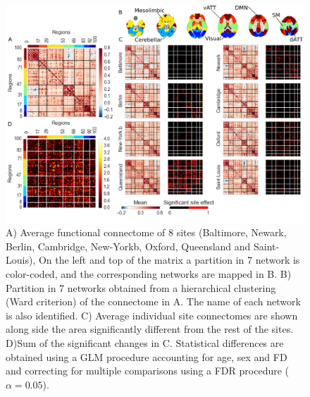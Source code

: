 \documentclass[authoryear]{elsarticle}
\begin{document}
\begin{figure}[tbp]
\begin{center}
\includegraphics[width=\linewidth]{../figures/connectome_multisite.png}
\end{center}
\caption[Connectome variability across sites]{
A) Average functional connectome of 8 sites (Baltimore, Newark, Berlin, Cambridge, New-Yorkb, Oxford, Queensland and Saint-Louis), On the left and top of the matrix a partition in 7 network is color-coded, and the corresponding networks are mapped in B.
B) Partition in 7 networks obtained from a hierarchical clustering (Ward criterion) of the connectome in A. The name of each network is also identified.
C) Average individual site connectomes are shown along side the area significantly different from the rest of the sites.
D)Sum of the significant changes in C. Statistical differences are obtained using a GLM procedure accounting for age, sex and FD and correcting for multiple comparisons using a FDR procedure ($\alpha=0.05$).
}
\label{fig_connectome_variability}
\end{figure}
\end{document}
